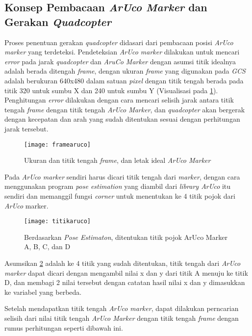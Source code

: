 \subsection{Konsep Pembacaan \textit{ArUco Marker} dan Gerakan \textit{Quadcopter}}
Proses penentuan gerakan \textit{quadcopter} didasari dari pembacaan posisi \textit{ArUco marker} yang terdeteksi. Pendeteksian \textit{ArUco marker} dilakukan untuk mencari \textit{error} pada jarak \textit{quadcopter} dan \textit{AruCo Marker} dengan asumsi titik idealnya adalah berada ditengah \textit{frame}, dengan ukuran \textit{frame} yang digunakan pada \textit{GCS} adalah berukuran 640x480 dalam satuan \textit{pixel} dengan titik tengah berada pada titik 320 untuk sumbu X dan 240 untuk sumbu Y (Visualisasi pada \cref{fig:framearuco}). Penghitungan \textit{error} dilakukan dengan cara mencari selisih jarak antara titik tengah \textit{frame} dengan titik tengah \textit{ArUco Marker}, dan \textit{quadcopter} akan bergerak dengan kecepatan dan arah yang sudah ditentukan sesuai dengan perhitungan jarak tersebut.

\begin{figure}[H]
	\centering
	\texttt{[image: framearuco]}
	\caption{Ukuran dan titik tengah \textit{frame}, dan letak ideal \textit{ArUco Marker}}
	\label{fig:framearuco}
\end{figure}


Pada \textit{ArUco marker} sendiri harus dicari titik tengah dari \textit{marker}, dengan cara menggunakan program \textit{pose estimation} yang diambil dari \textit{library ArUco} itu sendiri dan memanggil fungsi \textit{corner} untuk menentukan ke 4 titik pojok dari \textit{ArUco} marker. 

\begin{figure}[H]
	\centering
	\texttt{[image: titikaruco]}
	\caption{Berdasarkan \textit{Pose Estimaton}, ditentukan titik pojok ArUco Marker A, B, C, dan D}
	\label{fig:titikaruco}
\end{figure}

Asumsikan \cref{fig:titikaruco} adalah ke 4 titik yang sudah ditentukan, titik tengah dari \textit{ArUco marker} dapat dicari dengan mengambil nilai x dan y dari titik A menuju ke titik D, dan membagi 2 nilai tersebut dengan catatan hasil nilai x dan y dimasukkan ke variabel yang berbeda.

Setelah mendapatkan titik tengah \textit{ArUco marker}, dapat dilakukan perncarian selisih dari nilai titik tengah \textit{ArUco Marker} dengan titik tengah \textit{frame} dengan rumus perhitungan seperti dibawah ini. \\

